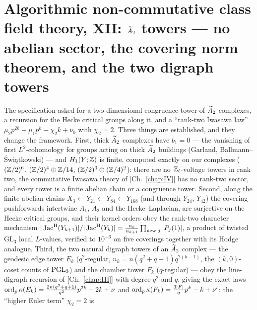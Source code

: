 \chapter[\texorpdfstring{XII. $\Atwo$ towers --- no abelian sector, the covering norm theorem, and the two digraph towers}{XII. A2 towers -- no abelian sector, the covering norm theorem, and the two digraph towers}]{\texorpdfstring{Algorithmic non-commutative class field theory, XII: $\Atwo$ towers --- no abelian sector, the covering norm theorem, and the two digraph towers}{Algorithmic non-commutative class field theory, XII: A2 towers -- no abelian sector, the covering norm theorem, and the two digraph towers}}\label{chap:XII}
\begin{chapterabstract}
The specification asked for a two-dimensional congruence tower of $\Atwo$ complexes, a
recursion for the Hecke critical groups along it, and a ``rank-two Iwasawa law''
$\mu_2p^{2k}+\mu_1p^{k}-\chi_2k+\nu_0$ with $\chi_2=2$. Three things are established, and they
change the framework. First, thick $\Atwo$ complexes have $b_1=0$ --- the vanishing of first
$L^{2}$-cohomology for groups acting on thick $\Atwo$ buildings (Garland,
Ballmann--\'Swi\k{a}tkowski) --- and $H_1(Y;\mathbb{Z})$ is finite, computed exactly on our complexes
($(\mathbb{Z}/2)^{6}$, $(\mathbb{Z}/2)^{4}\oplus\mathbb{Z}/14$, $(\mathbb{Z}/2)^{3}\oplus(\mathbb{Z}/4)^{2}$): there are no
$\mathbb{Z}_\ell$-voltage towers in rank two, the commutative Iwasawa theory of [Ch.~\ref{chap:IV}] has no rank-two
sector, and every tower is a finite abelian chain or a congruence tower. Second, along the
finite abelian chains $X_3\leftarrow Y_{21}\leftarrow Y_{84}\leftarrow Y_{168}$ (and through
$Y_{24}$, $Y_{42}$) the covering pushforwards intertwine $A_1$, $A_2$ and the Hecke--Laplacian,
are surjective on the Hecke critical groups, and their kernel orders obey the rank-two
character mechanism $|\operatorname{Jac}^{\mathrm{H}}(Y_{k+1})|/|\operatorname{Jac}^{\mathrm{H}}(Y_k)|=\frac{n_k}{n_{k+1}}\prod_{\text{new }j}
|P_j(1)|$, a product of twisted $\mathrm{GL}_3$ local $L$-values, verified to $10^{-6}$ on
five coverings together with its Hodge analogue. Third, the two natural digraph towers of an
$\Atwo$ complex --- the geodesic edge tower $E_k$ ($q^{2}$-regular, $n_k=n(q^{2}+q+1)q^{2(k-1)}$,
the $(k,0)$-coset counts of $\mathrm{PGL}_3$) and the chamber tower $F_k$ ($q$-regular) --- obey the
line-digraph recursion of [Ch.~\ref{chap:III}] with degree $q^{2}$ and $q$, giving the exact laws
$\operatorname{ord}_p\kappa(E_k)=\frac{2n(q^{2}+q+1)}{q^{2}}p^{2k}-2k+\nu$ and
$\operatorname{ord}_p\kappa(F_k)=\frac{3|F|}{q}p^{k}-k+\nu'$: the ``higher Euler term'' $\chi_2=2$ is

\end{chapterabstract}
